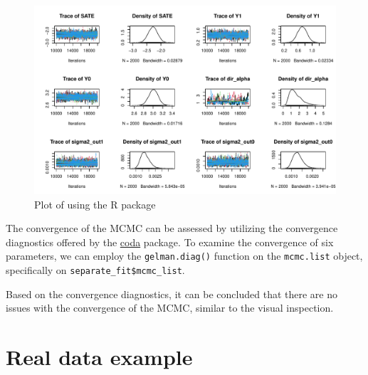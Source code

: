 \begin{figure}[htbp]
\centering
\includegraphics[width=0.99\linewidth]{fig/sep_mcmc_list.pdf}
\caption{Plot of  using the  R package}\label{fig:mcmc_list}
\end{figure}


The convergence of the MCMC  can be assessed by utilizing the convergence diagnostics offered by the \href{https://cran.r-project.org/package=coda}{coda} package. To examine the convergence of six parameters, we can employ the \verb|gelman.diag()| function on the \verb|mcmc.list| object, specifically on \verb|separate_fit$mcmc_list|.



Based on the convergence diagnostics, it can be concluded that there are no issues with the convergence of the MCMC, similar to the visual inspection.





\section{Real data example} \label{sec:real_data}

